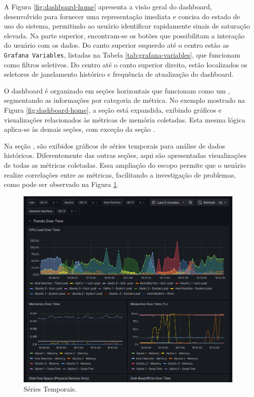 A Figura \ref{fig:dashboard-home} apresenta a visão geral do dashboard, desenvolvido para fornecer uma representação imediata e concisa do estado de uso do sistema, permitindo ao usuário identificar rapidamente sinais de saturação elevada. Na parte superior, encontram-se os botões que possibilitam a interação do usuário com os dados. Do canto superior esquerdo até o centro estão as \verb|Grafana Variables|, listadas na Tabela \ref{tab:grafana-variables}, que funcionam como filtros seletivos. Do centro até o canto superior direito, estão localizados os seletores de janelamento histórico e frequência de atualização do dashboard.

O dashboard é organizado em seções horizontais que funcionam como um , segmentando as informações por categoria de métrica. No exemplo mostrado na Figura \ref{fig:dashboard-home}, a seção  está expandida, exibindo gráficos e visualizações relacionados às métricas de memória coletadas. Esta mesma lógica aplica-se às demais seções, com exceção da seção .

Na seção , são exibidos gráficos de séries temporais para análise de dados históricos. Diferentemente das outras seções, aqui são apresentadas visualizações de todas as métricas coletadas. Essa ampliação do escopo permite que o usuário realize correlações entre as métricas, facilitando a investigação de problemas, como pode ser observado na Figura \ref{fig:dashboard-timeseries}.

\begin{figure}[H]
\centering
\setlength{\abovecaptionskip}{-20pt}
\includegraphics[width=\textwidth]{Imagens/chap04/dashboard/trends_over_time.png}
\caption{Séries Temporais.}
\label{fig:dashboard-timeseries}
\end{figure}

